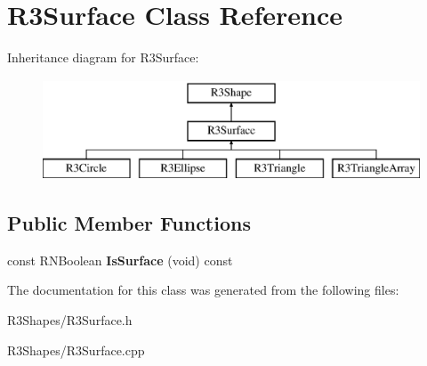 \hypertarget{class_r3_surface}{}\section{R3\+Surface Class Reference}
\label{class_r3_surface}
Inheritance diagram for R3\+Surface\+:\begin{figure}[H]
\begin{center}
\leavevmode
\includegraphics[height=3.000000cm]{class_r3_surface}
\end{center}
\end{figure}
\subsection*{Public Member Functions}
\begin{DoxyCompactItemize}
\item 
const R\+N\+Boolean {\bfseries Is\+Surface} (void) const \hypertarget{class_r3_surface_a3f1105fa345ce0e7f1a754b2d0be629c}{}\label{class_r3_surface_a3f1105fa345ce0e7f1a754b2d0be629c}

\end{DoxyCompactItemize}


The documentation for this class was generated from the following files\+:\begin{DoxyCompactItemize}
\item 
R3\+Shapes/R3\+Surface.\+h\item 
R3\+Shapes/R3\+Surface.\+cpp\end{DoxyCompactItemize}
